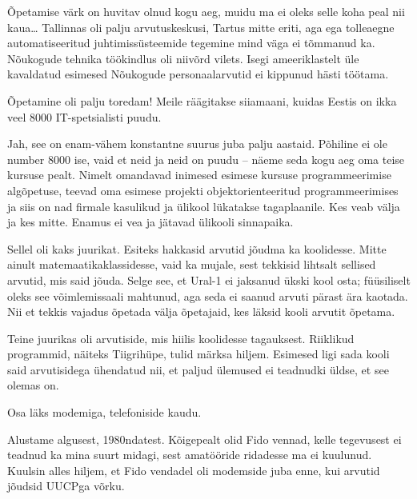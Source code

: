 Õpetamise värk on huvitav olnud kogu aeg, muidu ma ei oleks selle
koha peal nii kaua\ldots{ }Tallinnas oli palju arvutuskeskusi, Tartus mitte eriti, aga ega
tolleaegne automatiseeritud juhtimissüsteemide
tegemine mind väga ei tõmmanud ka. Nõukogude tehnika töökindlus oli niivõrd vilets. Isegi
ameeriklastelt üle kavaldatud esimesed Nõukogude personaalarvutid ei kippunud
hästi töötama.

Õpetamine oli palju toredam! Meile räägitakse siiamaani, kuidas
Eestis on ikka veel 8000 IT-spetsialisti puudu.


Jah, see on enam-vähem konstantne suurus juba
palju aastaid. Põhiline ei ole number 8000 ise, vaid
et neid ja neid on puudu -- näeme seda kogu aeg oma teise kursuse pealt.
Nimelt omandavad inimesed esimese kursuse programmeerimise algõpetuse, teevad
oma esimese projekti objektorienteeritud programmeerimises ja siis on nad
firmale kasulikud ja ülikool lükatakse tagaplaanile. Kes veab välja
ja kes mitte. Enamus ei vea ja jätavad ülikooli sinnapaika.


Sellel oli kaks juurikat. Esiteks hakkasid arvutid
jõudma ka koolidesse. Mitte ainult matemaatikaklassidesse, vaid ka mujale, sest
tekkisid lihtsalt sellised arvutid, mis said jõuda. Selge see, et Ural-1 ei jaksanud ükski
kool osta; füüsiliselt oleks see võimlemissaali mahtunud,
aga seda ei saanud arvuti pärast ära kaotada. Nii et tekkis vajadus õpetada välja õpetajaid, kes
läksid kooli arvutit õpetama.

Teine juurikas oli arvutiside, mis hiilis koolidesse tagauksest. Riiklikud programmid, näiteks
Tiigrihüpe, tulid märksa hiljem. Esimesed ligi sada kooli said arvutisidega ühendatud nii, et paljud ülemused ei
teadnudki üldse, et see olemas on.


Osa läks modemiga, telefoniside kaudu.


Alustame algusest, 1980ndatest. Kõigepealt
olid Fido vennad, kelle tegevusest ei teadnud ka mina
suurt midagi, sest amatööride ridadesse ma ei kuulunud. Kuulsin
alles hiljem, et Fido vendadel oli modemside juba enne, kui arvutid jõudsid UUCPga
võrku.

